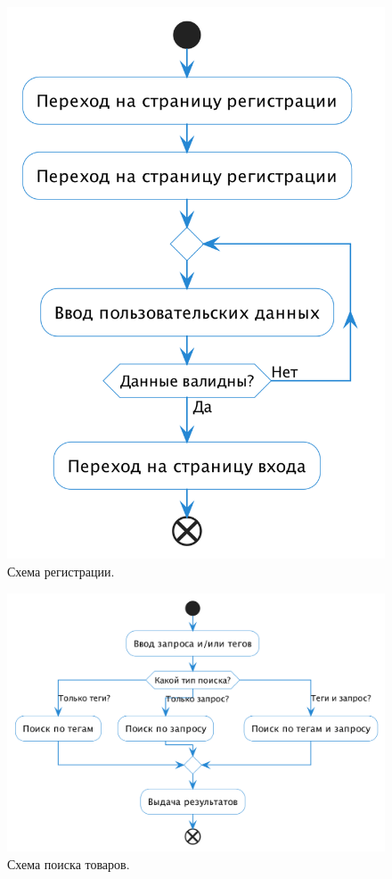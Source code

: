 \documentclass[a4paper,14pt]{extarticle}
\begin{document}
\begin{figure}[H]
    \centering
    \includegraphics[height=0.5\textheight]{images/register.png}
    \caption{Схема регистрации.}
\end{figure}

\begin{figure}[H]
    \centering
    \includegraphics[width=\textwidth]{images/search.png}
    \caption{Схема поиска товаров.}
\end{figure}
\end{document}
